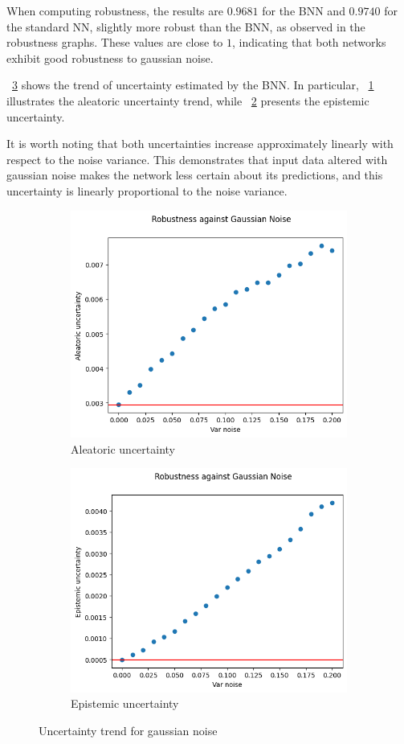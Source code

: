 When computing robustness, the results are $0.9681$ for the BNN and $0.9740$ for the standard NN, slightly more robust than the BNN, as observed in the robustness graphs. These values are close to $1$, indicating that both networks exhibit good robustness to gaussian noise.

\Fig~\ref{fig:gn_uncertainty} shows the trend of uncertainty estimated by the BNN. In particular, \Fig~\ref{fig:gn_aleatoric} illustrates the aleatoric uncertainty trend, while \Fig~\ref{fig:gn_epistemic} presents the epistemic uncertainty.

It is worth noting that both uncertainties increase approximately linearly with respect to the noise variance. This demonstrates that input data altered with gaussian noise makes the network less certain about its predictions, and this uncertainty is linearly proportional to the noise variance.

\begin{figure}[h]
	\centering
	\begin{subfigure}{.5\textwidth}
		\centering
		\includegraphics[width=0.8\linewidth]{ImageFiles/EvalBNN/GN/aleatoric}
		\caption{Aleatoric uncertainty}
		\label{fig:gn_aleatoric}
	\end{subfigure}%
	\begin{subfigure}{.5\textwidth}
		\centering
		\includegraphics[width=0.8\linewidth]{ImageFiles/EvalBNN/GN/epistemic}
		\caption{Epistemic uncertainty}
		\label{fig:gn_epistemic}
	\end{subfigure}
	\caption{Uncertainty trend for gaussian noise}
	\label{fig:gn_uncertainty}
\end{figure}

